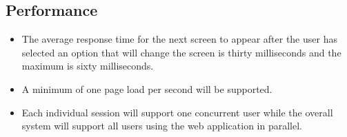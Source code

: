 \subsection{Performance}
\begin{itemize}
\item The average response time for the next screen to appear after the user has selected an option that will change the screen is thirty milliseconds and the maximum is sixty milliseconds.
\item A minimum of one page load per second will be supported.
\item Each individual session will support one concurrent user while the overall system will support all users using the web application in parallel.
\end{itemize}
